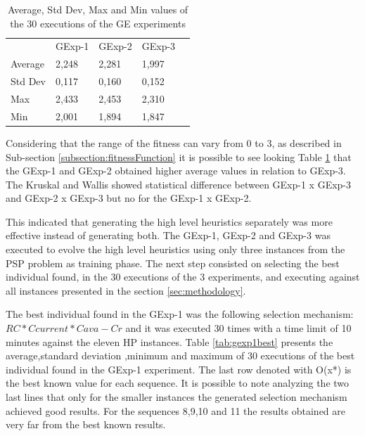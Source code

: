 \documentclass[conference]{IEEEtran}
\begin{document}
\begin{table}[]
	\centering
	\caption{Average, Std Dev, Max and Min values of the 30 executions of the GE experiments}
	\label{tab:geExps}
	\begin{tabular}{lllll}
		& GExp-1 & GExp-2 & GExp-3 &  \\ \cline{1-4}
		Average & 2,248  & 2,281  & 1,997  &  \\ \cline{1-4}
		Std Dev & 0,117  & 0,160  & 0,152  &  \\ \cline{1-4}
		Max     & 2,433  & 2,453  & 2,310  &  \\ \cline{1-4}
		Min     & 2,001  & 1,894  & 1,847  & 
	\end{tabular}
\end{table}

Considering that the range of the fitness can vary from 0 to 3, as described in Sub-section \ref{subsection:fitnessFunction} it is possible to see looking Table \ref{tab:geExps} that the GExp-1 and GExp-2 obtained higher average values in relation to GExp-3. The Kruskal and Wallis showed statistical difference between GExp-1 x GExp-3  and GExp-2 x GExp-3 but no for the GExp-1 x GExp-2.

This indicated that generating the high level heuristics separately was more effective instead of generating both. The GExp-1, GExp-2 and GExp-3 was executed to evolve the high level heuristics using only three instances from the PSP problem as training phase. The next step consisted on selecting the best individual found, in the 30 executions of the 3 experiments, and executing against all instances presented in the section \ref{sec:methodology}.

The best individual found in the GExp-1 was the following selection mechanism:  $RC * Ccurrent * Cava - Cr$ and it was executed 30 times with a time limit of 10 minutes against the eleven HP instances. Table \ref{tab:gexp1best}  presents the average,standard deviation ,minimum and maximum of 30 executions of the best individual found in the GExp-1 experiment. The last row denoted with O(x*) is the best known value for each sequence. It is possible to note analyzing the two last lines that only for the smaller instances the generated selection mechanism achieved good results. For the sequences 8,9,10 and 11 the results obtained are very far from the best known results.
\end{document}
